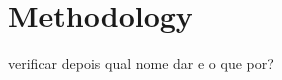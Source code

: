 \chapter{Methodology}%
\label{chapter:methodology}


\begin{introduction}
    verificar depois qual nome dar e o que por?
\end{introduction}




